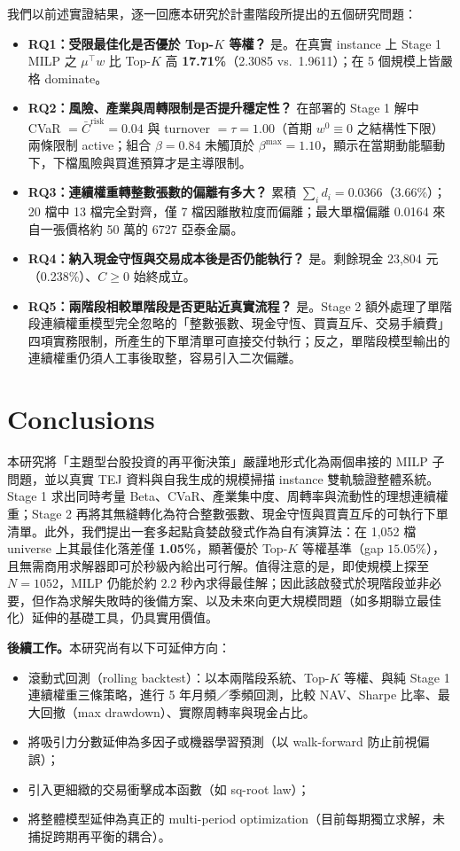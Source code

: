 \documentclass[11pt,a4paper]{article}
\newenvironment{itemizeTight}{\begin{itemize}\vspace{-8pt}}{\end{itemize}\vspace{-8pt}}
\begin{document}
我們以前述實證結果，逐一回應本研究於計畫階段所提出的五個研究問題：
\begin{itemize}[leftmargin=2em]
    \item \textbf{RQ1：受限最佳化是否優於 Top-$K$ 等權？} 是。在真實 instance 上 Stage 1 MILP 之 $\mu^\top w$ 比 Top-$K$ 高 \textbf{17.71\%}（2.3085 vs.\ 1.9611）；在 5 個規模上皆嚴格 dominate。
    \item \textbf{RQ2：風險、產業與周轉限制是否提升穩定性？} 在部署的 Stage 1 解中 CVaR $= \bar{C}^{\text{risk}} = 0.04$ 與 turnover $= \tau = 1.00$（首期 $w^0 \equiv 0$ 之結構性下限）兩條限制 active；組合 $\beta = 0.84$ 未觸頂於 $\beta^{\max} = 1.10$，顯示在當期動能驅動下，下檔風險與買進預算才是主導限制。
    \item \textbf{RQ3：連續權重轉整數張數的偏離有多大？} 累積 $\sum_i d_i = 0.0366$（3.66\%）；20 檔中 13 檔完全對齊，僅 7 檔因離散粒度而偏離；最大單檔偏離 0.0164 來自一張價格約 50 萬的 6727 亞泰金屬。
    \item \textbf{RQ4：納入現金守恆與交易成本後是否仍能執行？} 是。剩餘現金 23{,}804 元（0.238\%）、$C \geq 0$ 始終成立。
    \item \textbf{RQ5：兩階段相較單階段是否更貼近真實流程？} 是。Stage 2 額外處理了單階段連續權重模型完全忽略的「整數張數、現金守恆、買賣互斥、交易手續費」四項實務限制，所產生的下單清單可直接交付執行；反之，單階段模型輸出的連續權重仍須人工事後取整，容易引入二次偏離。
\end{itemize}



\section{Conclusions}
\label{sec-conclusion}

本研究將「主題型台股投資的再平衡決策」嚴謹地形式化為兩個串接的 MILP 子問題，並以真實 TEJ 資料與自我生成的規模掃描 instance 雙軌驗證整體系統。Stage 1 求出同時考量 Beta、CVaR、產業集中度、周轉率與流動性的理想連續權重；Stage 2 再將其無縫轉化為符合整數張數、現金守恆與買賣互斥的可執行下單清單。此外，我們提出一套多起點貪婪啟發式作為自有演算法：在 1{,}052 檔 universe 上其最佳化落差僅 \textbf{1.05\%}，顯著優於 Top-$K$ 等權基準（gap $15.05\%$），且無需商用求解器即可於秒級內給出可行解。值得注意的是，即使規模上探至 $N = 1052$，MILP 仍能於約 $2.2$ 秒內求得最佳解；因此該啟發式於現階段並非必要，但作為求解失敗時的後備方案、以及未來向更大規模問題（如多期聯立最佳化）延伸的基礎工具，仍具實用價值。

\textbf{後續工作。}{}本研究尚有以下可延伸方向：
\begin{itemizeTight}
    \item 滾動式回測（rolling backtest）：以本兩階段系統、Top-$K$ 等權、與純 Stage 1 連續權重三條策略，進行 5 年月頻／季頻回測，比較 NAV、Sharpe 比率、最大回撤（max drawdown）、實際周轉率與現金占比。
    \item 將吸引力分數延伸為多因子或機器學習預測（以 walk-forward 防止前視偏誤）；
    \item 引入更細緻的交易衝擊成本函數（如 sq-root law）；
    \item 將整體模型延伸為真正的 multi-period optimization（目前每期獨立求解，未捕捉跨期再平衡的耦合）。
\end{itemizeTight}
\end{document}
